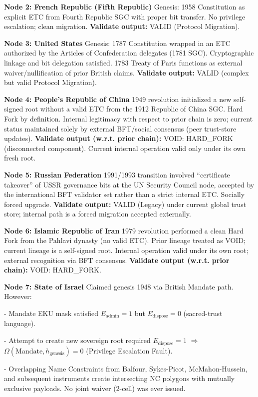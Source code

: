 \documentclass[11pt,a4paper]{article}
\begin{document}
\textbf{Node 2: French Republic (Fifth Republic)}  
Genesis: 1958 Constitution as explicit ETC from Fourth Republic SGC with proper bit transfer. No privilege escalation; clean migration.  
\textbf{Validate output:} VALID (Protocol Migration).

\textbf{Node 3: United States}  
Genesis: 1787 Constitution wrapped in an ETC authorized by the Articles of Confederation delegates (1781 SGC). Cryptographic linkage and bit delegation satisfied. 1783 Treaty of Paris functions as external waiver/nullification of prior British claims.  
\textbf{Validate output:} VALID (complex but valid Protocol Migration).

\textbf{Node 4: People’s Republic of China}  
1949 revolution initialized a new self-signed root without a valid ETC from the 1912 Republic of China SGC. Hard Fork by definition. Internal legitimacy with respect to prior chain is zero; current status maintained solely by external BFT/social consensus (peer trust-store updates).  
\textbf{Validate output (w.r.t. prior chain):} VOID: HARD\_FORK (disconnected component). Current internal operation valid only under its own fresh root.

\textbf{Node 5: Russian Federation}  
1991/1993 transition involved “certificate takeover” of USSR governance bits at the UN Security Council node, accepted by the international BFT validator set rather than a strict internal ETC. Socially forced upgrade.  
\textbf{Validate output:} VALID (Legacy) under current global trust store; internal path is a forced migration accepted externally.

\textbf{Node 6: Islamic Republic of Iran}  
1979 revolution performed a clean Hard Fork from the Pahlavi dynasty (no valid ETC). Prior lineage treated as VOID; current lineage is a self-signed root. Internal operation valid under its own root; external recognition via BFT consensus.  
\textbf{Validate output (w.r.t. prior chain):} VOID: HARD\_FORK.

\textbf{Node 7: State of Israel}  
Claimed genesis 1948 via British Mandate path. However:  

- Mandate EKU mask satisfied \(E_{\text{admin}}=1\) but \(E_{\text{dispose}}=0\) (sacred-trust language).  

- Attempt to create new sovereign root required \(E_{\text{dispose}}=1\) \(\Rightarrow\) \(\Omega(\text{Mandate}, h_{\text{genesis}}) = 0\) (Privilege Escalation Fault).  

- Overlapping Name Constraints from Balfour, Sykes-Picot, McMahon-Hussein, and subsequent instruments create intersecting NC polygons with mutually exclusive payloads. No joint waiver (2-cell) was ever issued.  
\end{document}
